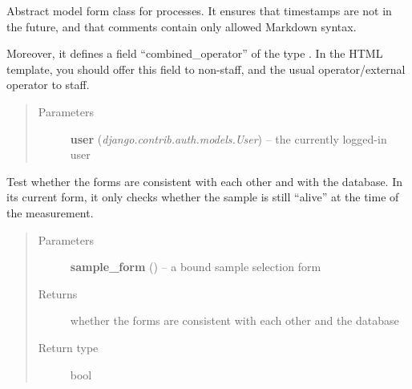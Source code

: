 \documentclass[a4paper,11pt,english]{sphinxmanual}
\begin{document}
\begin{fulllineitems}
\label{programming/utilities:samples.utils.views.ProcessForm}
Abstract model form class for processes.  It ensures that timestamps are not
in the future, and that comments contain only allowed Markdown syntax.

Moreover, it defines a field “combined\_operator” of the type
.  In the HTML template, you should offer this
field to non-staff, and the usual operator/external operator to staff.
\begin{quote}\begin{description}
\item[{Parameters}] \leavevmode
\textbf{user} (\emph{django.contrib.auth.models.User}) -- the currently logged-in user

\end{description}\end{quote}

\begin{fulllineitems}
\label{programming/utilities:samples.utils.views.ProcessForm.is_referentially_valid}
Test whether the forms are consistent with each other and with the database.
In its current form, it only checks whether the sample is still “alive”
at the time of the measurement.
\begin{quote}\begin{description}
\item[{Parameters}] \leavevmode
\textbf{sample\_form} () -- a bound sample selection form

\item[{Returns}] \leavevmode
whether the forms are consistent with each other and the database

\item[{Return type}] \leavevmode
bool

\end{description}\end{quote}

\end{fulllineitems}


\end{fulllineitems}

\end{document}
